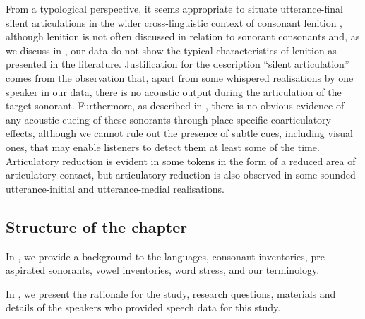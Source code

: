 \documentclass[output=paper]{langscibook}
\begin{document}
From a typological perspective, it seems appropriate to situate utterance-final silent articulations in the wider cross-linguistic context of consonant lenition \citep{Kirchner1998}, although lenition is not often discussed in relation to sonorant consonants and, as we discuss in , our data do not show the typical characteristics of lenition as presented in the literature. Justification for the description ``silent articulation'' comes from the observation that, apart from some whispered realisations by one speaker in our data, there is no acoustic output during the articulation of the target sonorant. Furthermore, as described in , there is no obvious evidence of any acoustic cueing of these sonorants through place-specific coarticulatory effects, although we cannot rule out the presence of subtle cues, including visual ones, that may enable listeners to detect them at least some of the time. Articulatory reduction is evident in some tokens in the form of a reduced area of articulatory contact, but articulatory reduction is also observed in some sounded utterance-initial and utterance-medial realisations.

\subsection{Structure of the chapter} %
\label{sec:watson:1.1}
In , we provide a background to the languages, consonant inventories, pre-aspirated sonorants, vowel inventories, word stress, and our terminology.

In , we present the rationale for the study, research questions, materials and details of the speakers who provided speech data for this study.
\end{document}
